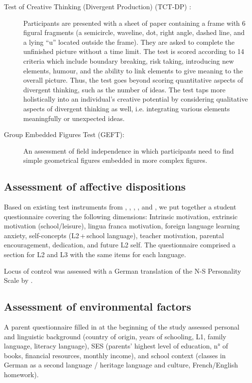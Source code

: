 \documentclass[output=paper]{langsci/langscibook}
\begin{document}
\begin{description}
\item[Test of Creative Thinking (Divergent Production) (TCT-DP) {\upshape\citep{UrbanJellen1995}}:] Participants are presented with a sheet of paper containing a frame with 6 figural fragments (a semicircle, waveline, dot, right angle, dashed line, and a lying “u” located outside the frame). They are asked to complete the unfinished picture without a time limit. The test is scored according to 14 criteria which include boundary breaking, risk taking, introducing new elements, humour, and the ability to link elements to give meaning to the overall picture. Thus, the test goes beyond scoring quantitative aspects of divergent thinking, such as the number of ideas. The test taps more holistically into an individual’s creative potential by considering qualitative aspects of divergent thinking as well, i.e. integrating various elements meaningfully or unexpected ideas.

\item[Group Embedded Figures Test (GEFT):] An assessment of field independence \citep{WitkinEtAl2014} in which participants need to find simple geometrical figures embedded in more complex figures.
\end{description}

\subsection{Assessment of affective dispositions}
Based on existing test instruments from \citet{HorwitzEtAl1986}, \citet{Stoeckli2004}, \citet{Doernyei2010}, \citet{Heinzmann2013}, and \citet{PeyerEtAl2016}, we put together a student questionnaire covering the following dimensions: Intrinsic motivation, extrinsic motivation (school/leisure), lingua franca motivation, foreign language learning anxiety, self-concepts (L2\,+\,school language), teacher motivation, parental encouragement, dedication, and future L2 self. The questionnaire comprised a section for L2 and L3 with the same items for each language. 

Locus of control was assessed with a German translation of the N-S Personality Scale by \citet{NowickiStrickland1973}.

\subsection{Assessment of environmental factors}
A parent questionnaire filled in at the beginning of the study assessed personal and linguistic background (country of origin, years of schooling, L1, family language, literacy language), SES (parents’ highest level of education, n° of books, financial resources, monthly income), and school context (classes in German as a second language / heritage language and culture, French/English homework).
\end{document}
